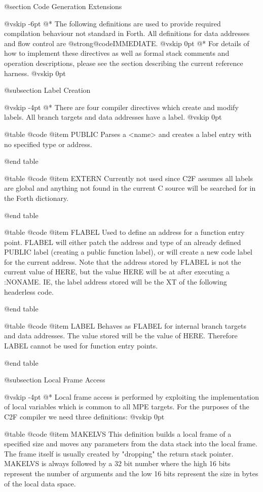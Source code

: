 @section Code Generation Extensions


@vskip -6pt
@*
The following definitions are used to provide required compilation
behaviour not standard in Forth. All definitions for data addresses
and flow control are @strong{@code{IMMEDIATE}}.
@vskip 0pt
@*
For details of how to implement these directives as well as formal
stack comments and operation descriptions, please see the section
describing the current reference harness.
@vskip 0pt

@subsection Label Creation


@vskip -4pt
@*
There are four compiler directives which create and modify labels.
All branch targets and data addresses have a label.
@vskip 0pt


@table @code
@item PUBLIC
Parses a <name> and creates a label entry with no
 specified type or address.

@end table



@table @code
@item EXTERN
Currently not used since C2F assumes all labels are
 global and anything not found in the current C source
 will be searched for in the Forth dictionary.

@end table



@table @code
@item FLABEL
Used to define an address for a function entry point.
 FLABEL will either patch the address and type of an
 already defined PUBLIC label (creating a public function
 label), or will create a new code label for the current
 address. Note that the address stored by FLABEL is not
 the current value of HERE, but the value HERE will be at
 after executing a :NONAME. IE, the label address stored
 will be the XT of the following headerless code.

@end table



@table @code
@item LABEL
Behaves as FLABEL for internal branch targets and
 data addresses. The value stored will be the value of
 HERE. Therefore LABEL cannot be used for function entry
 points.

@end table


@subsection Local Frame Access


@vskip -4pt
@*
Local frame access is performed by exploiting the implementation
of local variables which is common to all MPE targets. For the
purposes of the C2F compiler we need three definitions:
@vskip 0pt


@table @code
@item MAKELVS
This definition builds a local frame of a specified size
 and moves any parameters from the data stack into the
 local frame. The frame itself is usually created by
 "dropping" the return stack pointer.
 MAKELVS is always followed by a 32 bit number where the
 high 16 bits represent the number of arguments and the
 low 16 bits represent the size in bytes of the local
 data space.

